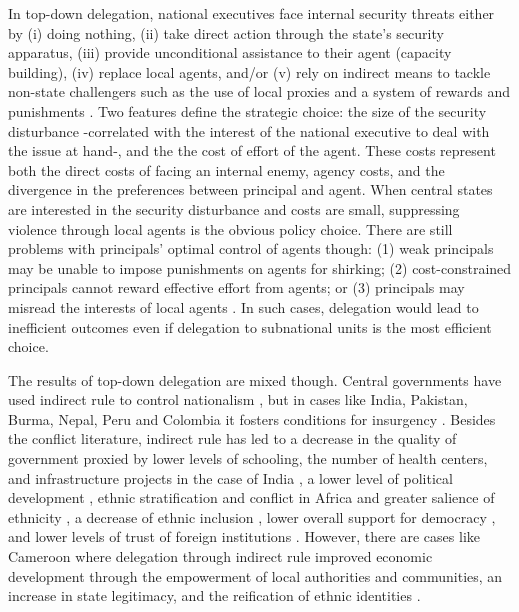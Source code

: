 \documentclass[12pt]{amsart}
\numberwithin{equation}{section}
\theoremstyle{definition}
\theoremstyle{definition}
\theoremstyle{definition}
\begin{document}
In top-down delegation, national executives face internal security threats either by (i) doing nothing, (ii) take direct action through the state's security apparatus, (iii) provide unconditional assistance to their agent (capacity building), (iv) replace local agents, and/or (v) rely on indirect means to tackle non-state challengers such as the use of local proxies and a system of rewards and punishments \citet{berman_lake_2019}.  Two features define the strategic choice: the size of the security disturbance -correlated with the interest of the national executive to deal with the issue at hand-, and the the cost of effort of the agent. These costs represent both the direct costs of facing an internal enemy, agency costs, and the divergence in the preferences between principal and agent. When central states are interested in the security disturbance and costs are small, suppressing violence through local agents is the obvious policy choice. There are still problems with principals’ optimal control of agents though: (1) weak principals may be unable to impose punishments on agents for shirking; (2) cost-constrained principals cannot reward effective effort from agents; or (3) principals may misread the interests of local agents \citet{berman_lake_2019}. In such cases, delegation would lead to inefficient outcomes even if delegation to subnational units is the most efficient choice. 

The results of top-down delegation are mixed though. Central governments have used indirect rule to control nationalism \citep{siroky_2021}, but in cases like India, Pakistan, Burma, Nepal, Peru and Colombia it fosters conditions for insurgency \citep{Mukherjee_2018}. Besides the conflict literature, indirect rule has led to a decrease in the quality of government proxied by lower levels of schooling, the number of health centers, and infrastructure projects in the case of India \citep{lyer_2010}, a lower level of political development \citep{lange_2004}, ethnic stratification and conflict in Africa \citep{Blanton_etal_2001} and greater salience of ethnicity \citep{Mcnamee_2019}, a decrease of ethnic inclusion \citep{mcalexander_2020}, lower overall support for democracy \citep{lechler_2018}, and lower levels of trust of foreign institutions \citep{Okoye_2021}. However, there are cases like Cameroon where delegation through indirect rule improved economic development through the empowerment of local authorities and communities, an increase in state legitimacy, and the reification of ethnic identities \citep{letsa_2020}. 
\end{document}
